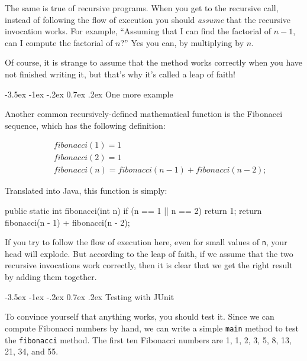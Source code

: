\documentclass[12pt]{book}
\makeatletter
\theoremstyle{exercise}
\newcommand{\java}[1]{\verb"#1"}
\renewcommand{\section}{\@startsection {section}{1}{\z@}%
    {-3.5ex \@plus -1ex \@minus -.2ex}%
    {0.7ex \@plus.2ex}%
    {\normalfont\Large\bfseries}}
\newcommand{\java}[1]{\lstinline{#1}} %
\makeatother
\begin{document}
The same is true of recursive programs.
When you get to the recursive call, instead of following the flow of execution you should {\em assume} that the recursive invocation works.
For example, ``Assuming that I can find the factorial of $n-1$, can I compute the factorial of $n$?''
Yes you can, by multiplying by $n$.

Of course, it is strange to assume that the method works correctly when you have not finished writing it, but that's why it's called a leap of faith!


\section{One more example}
\label{fibonacci}


Another common recursively-defined mathematical function is the Fibonacci sequence, which has the following definition:

\vspace{-1ex}
\begin{eqnarray*}
&& fibonacci(1) = 1 \\
&& fibonacci(2) = 1 \\
&& fibonacci(n) = fibonacci(n-1) + fibonacci(n-2);
\end{eqnarray*}
\vspace{-1ex}

Translated into Java, this function is simply:

\begin{code}
    public static int fibonacci(int n) {
        if (n == 1 || n == 2) {
            return 1;
        }
        return fibonacci(n - 1) + fibonacci(n - 2);
    }
\end{code}

If you try to follow the flow of execution here, even for small values of \java{n}, your head will explode.
But according to the leap of faith, if we assume that the two recursive invocations work correctly, then it is clear that we get the right result by adding them together.


\section{Testing with JUnit}
\label{JUnit}

To convince yourself that anything works, you should test it.
Since we can compute Fibonacci numbers by hand, we can write a simple \java{main} method to test the \java{fibonacci} method.
The first ten Fibonacci numbers are 1, 1, 2, 3, 5, 8, 13, 21, 34, and 55.
\end{document}
